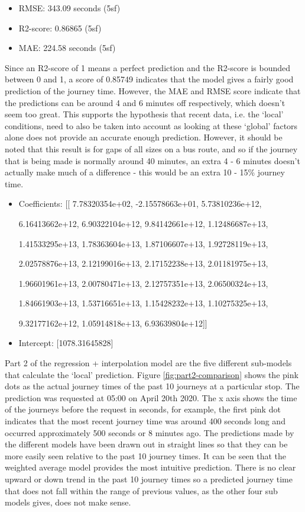 \begin{itemize}
    \item RMSE: 343.09 seconds (5sf)
    \item R2-score: 0.86865 (5sf)
    \item MAE: 224.58 seconds (5sf)
\end{itemize}

Since an R2-score of 1 means a perfect prediction and the R2-score is bounded between 0 and 1, a score of 0.85749 indicates that the model gives a fairly good prediction of the journey time. However, the MAE and RMSE score indicate that the predictions can be around 4 and 6 minutes off respectively, which doesn't seem too great. This supports the hypothesis that recent data, i.e. the `local' conditions, need to also be taken into account as looking at these `global' factors alone does not provide an accurate enough prediction. However, it should be noted that this result is for gaps of all sizes on a bus route, and so if the journey that is being made is normally around 40 minutes, an extra 4 - 6 minutes doesn't actually make much of a difference - this would be an extra 10 - 15\% journey time. 

\begin{itemize}
    \item Coefficients: [[ 7.78320354e+02, -2.15578663e+01, 5.73810236e+12, 
    
    6.16413662e+12, 6.90322104e+12, 9.84142661e+12, 1.12486687e+13, 
    
    1.41533295e+13, 1.78363604e+13, 1.87106607e+13, 1.92728119e+13, 
    
    2.02578876e+13, 2.12199016e+13, 2.17152238e+13, 2.01181975e+13, 
    
    1.96601961e+13, 2.00780471e+13, 2.12757351e+13, 2.06500324e+13, 
    
    1.84661903e+13, 1.53716651e+13, 1.15428232e+13, 1.10275325e+13, 
    
    9.32177162e+12, 1.05914818e+13, 6.93639804e+12]]
   \item Intercept: [1078.31645828]
\end{itemize}

Part 2 of the regression + interpolation model are the five different sub-models that calculate the `local' prediction. Figure \ref{fig:part2-comparison} shows the pink dots as the actual journey times of the past 10 journeys at a particular stop. The prediction was requested at 05:00 on April 20th 2020. The x axis shows the time of the journeys before the request in seconds, for example, the first pink dot indicates that the most recent journey time was around 400 seconds long and occurred approximately 500 seconds or 8 minutes ago. The predictions made by the different models have been drawn out in straight lines so that they can be more easily seen relative to the past 10 journey times. It can be seen that the weighted average model provides the most intuitive prediction. There is no clear upward or down trend in the past 10 journey times so a predicted journey time that does not fall within the range of previous values, as the other four sub models gives, does not make sense.

